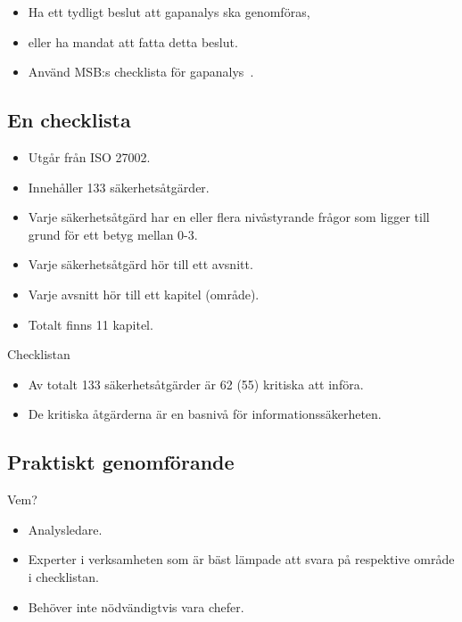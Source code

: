 \documentclass{beamer}
\begin{document}
\begin{frame}
  \begin{itemize}
    \item Ha ett tydligt beslut att gapanalys ska genomföras,
    \item eller ha mandat att fatta detta beslut.
    \item Använd MSB:s checklista för gapanalys~\cite{MSB2011gb}.
  \end{itemize}
\end{frame}

\subsection{En checklista}

\begin{frame}
  \begin{itemize}
    \item Utgår från ISO 27002.
    \item Innehåller 133 säkerhetsåtgärder.
    \item Varje säkerhetsåtgärd har en eller flera nivåstyrande frågor som 
      ligger till grund för ett betyg mellan 0-3.
    \item Varje säkerhetsåtgärd hör till ett avsnitt.
    \item Varje avsnitt hör till ett kapitel (område).
    \item Totalt finns 11 kapitel.
  \end{itemize}
\end{frame}

\begin{frame}{Checklistan}
  \begin{itemize}
    \item Av totalt 133 säkerhetsåtgärder är 62 (55) kritiska att införa.
    \item De kritiska åtgärderna är en basnivå för informationssäkerheten.
  \end{itemize}
\end{frame}

\subsection{Praktiskt genomförande}

\begin{frame}{Vem?}
  \begin{itemize}
    \item Analysledare.
    \item Experter i verksamheten som är bäst lämpade att svara på respektive 
      område i checklistan.
    \item Behöver inte nödvändigtvis vara chefer.
  \end{itemize}
\end{frame}
\end{document}
